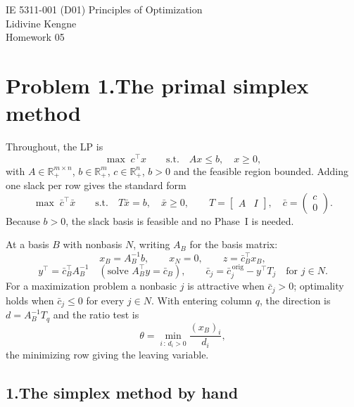 \documentclass[11pt]{article}
\DeclareMathOperator*{\maximize}{max}
\theoremstyle{definition}
\theoremstyle{plain}
\begin{document}
\begin{center}
  {\large IE 5311-001 (D01) Principles of Optimization}\\[4pt]
  Lidivine Kengne\\[2pt]
  Homework 05
\end{center}
\vspace{0.6em}

\section*{Problem 1.\quad The primal simplex method \quad[50 pts]}

Throughout, the LP is
\[
  \maximize \; c^{\!\top} x
  \qquad \text{s.t.} \quad Ax \le b, \quad x \ge 0,
\]
with $A \in \mathbb{R}^{m \times n}_+$, $b \in \mathbb{R}^m_+$,
$c \in \mathbb{R}^n_+$, $b > 0$ and the feasible region bounded. Adding
one slack per row gives the standard form
\[
  \maximize \; \bar{c}^{\!\top} \bar{x}
  \qquad \text{s.t.} \quad
  T \bar{x} = b, \quad \bar{x} \ge 0,
  \qquad
  T = \begin{bmatrix} A & I \end{bmatrix},
  \quad
  \bar{c} = \begin{pmatrix} c \\ 0 \end{pmatrix}.
\]
Because $b > 0$, the slack basis is feasible and no Phase~I is needed.

At a basis $B$ with nonbasis $N$, writing $A_B$ for the basis matrix:
\[
  x_B = A_B^{-1} b, \qquad x_N = 0, \qquad
  z = \bar{c}_B^{\!\top} x_B,
\]
\[
  y^{\!\top} = \bar{c}_B^{\!\top} A_B^{-1}
  \quad (\text{solve } A_B^{\!\top} y = \bar{c}_B),
  \qquad
  \bar{c}_j = \bar{c}_j^{\,\text{orig}} - y^{\!\top} T_j
  \quad \text{for } j \in N .
\]
For a maximization problem a nonbasic $j$ is attractive when
$\bar{c}_j > 0$; optimality holds when $\bar{c}_j \le 0$ for every
$j \in N$. With entering column $q$, the direction is
$d = A_B^{-1} T_q$ and the ratio test is
\[
  \theta = \min_{i\,:\,d_i > 0} \frac{(x_B)_i}{d_i},
\]
the minimizing row giving the leaving variable.

\subsection*{1.\quad The simplex method by hand}
\end{document}
